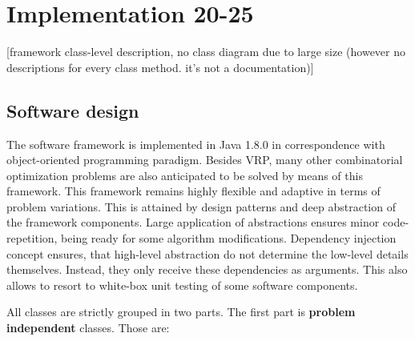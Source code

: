\documentclass[11pt,a4paper,oneside]{book}
\begin{document}
\chapter{Implementation 20-25}

[framework class-level description, no class diagram due to large size (however no descriptions for every class method. it's not a documentation)] \newline


\section{Software design}

The software framework is implemented in Java 1.8.0 in correspondence with object-oriented programming paradigm. Besides VRP, many other combinatorial optimization problems are also anticipated to be solved by means of this framework. This framework remains highly flexible and adaptive in terms of problem variations. This is attained by design patterns and deep abstraction of the framework components. Large application of abstractions ensures minor code-repetition, being ready for some algorithm modifications. Dependency injection concept ensures, that high-level abstraction do not determine the low-level details themselves. Instead, they only receive these dependencies as arguments. This also allows to resort to white-box unit testing of some software components.



All classes are strictly grouped in two parts. The first part is \textbf{problem independent} classes. Those are:
\end{document}
